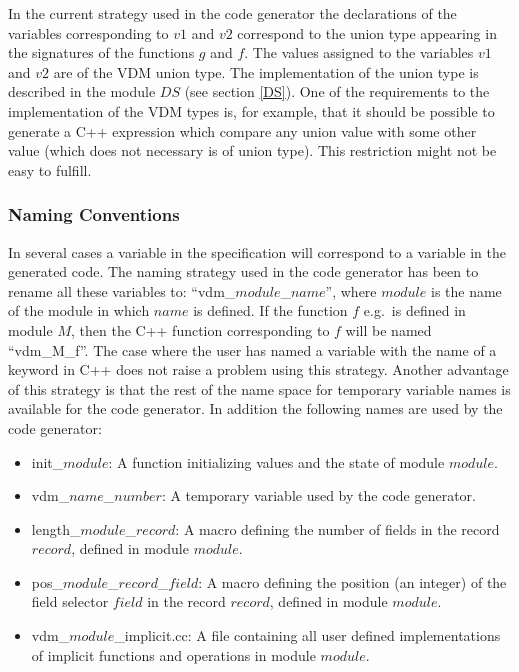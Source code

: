 \documentclass[a4paper,dvips]{article}
\begin{document}
In the current strategy used in the code generator the declarations of
the variables corresponding to $v1$ and $v2$ correspond to the union
type appearing in the signatures of the functions $g$ and $f$. The
values assigned to the variables $v1$ and $v2$ are of the VDM union
type. The implementation of the union type is described in the module
$DS$ (see section \ref{DS}). One of the requirements to the
implementation of the VDM types is, for example, that it should be
possible to generate a C++ expression which compare any union value
with some other value (which does not necessary is of union type).
This restriction might not be easy to fulfill.


\subsubsection{Naming Conventions}
\label{renamevar}

In several cases a variable in the specification will correspond to a
variable in the generated code. The naming strategy used in the
code generator has been to rename all these variables to:
``vdm\_$module$\_$name$'', where $module$ is the name of the module in
which $name$ is defined. If the function $f$ e.g.\ is defined in
module $M$, then the C++ function corresponding to $f$ will be named
``vdm\_M\_f''. The case where the user has named a variable with the
name of a keyword in C++ does not raise a problem using this strategy.
Another advantage of this strategy is that the rest of the name space
for temporary variable names is available for the code generator. In
addition the following names are used by the code generator:

\begin{itemize}
\item init\_$module$: A function initializing values and the state of
  module $module$.
\item vdm\_$name$\_$number$: A temporary variable used by the code
  generator.
\item length\_$module$\_$record$: A macro defining the number of
  fields in the record $record$, defined in module $module$.
\item pos\_$module$\_$record$\_$field$: A macro defining the position
  (an integer) of the field selector $field$ in the record $record$,
  defined in module $module$.
\item vdm\_$module$\_implicit.cc: A file containing all user defined
  implementations of implicit functions and operations in module $module$.
\end{itemize}
\end{document}
